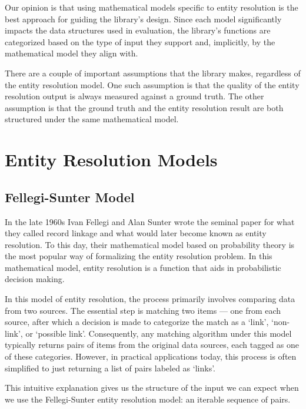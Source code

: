 \documentclass[11pt]{article}
\begin{document}
    Our opinion is that using mathematical models specific to entity resolution
    is the best approach for guiding the library's design.
    Since each model significantly impacts the data structures used in
    evaluation, the library's functions are categorized based on the type of
    input they support and, implicitly, by the mathematical model they align
    with.

    There are a couple of important assumptions that the library makes,
    regardless of the entity resolution model.
    One such assumption is that the quality of the entity resolution output is
    always measured against a ground truth\cite{manning2008}.
    The other assumption is that the ground truth and the entity resolution
    result are both structured under the same mathematical model.

    \section{Entity Resolution Models}\label{sec:models}
    \subsection{Fellegi-Sunter Model}
    In the late 1960s Ivan Fellegi and Alan Sunter wrote the seminal
    paper\cite{fs1969} for what they called record linkage and what would later
    become known as entity resolution.
    To this day, their mathematical model based on probability theory is the
    most popular way of formalizing the entity resolution problem.
    In this mathematical model, entity resolution is a function that aids in 
    probabilistic decision making.
    
    In this model of entity resolution, the process primarily involves comparing
    data from two sources.
    The essential step is matching two items --- one from each source, after
    which a decision is made to categorize the match as a `link', `non-link', or
    `possible link'.
    Consequently, any matching algorithm under this model typically returns
    pairs of items from the original data sources, each tagged as one of these
    categories.
    However, in practical applications today, this process is often simplified
    to just returning a list of pairs labeled as `links'.

    This intuitive explanation gives us the structure of the input we can expect
    when we use the Fellegi-Sunter entity resolution model: an iterable sequence
    of pairs.
\end{document}
